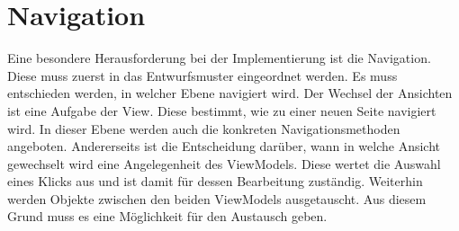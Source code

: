 \section{Navigation}
Eine besondere Herausforderung bei der Implementierung ist die Navigation. Diese muss zuerst in das Entwurfsmuster eingeordnet werden. Es muss entschieden werden, in welcher Ebene navigiert wird. Der Wechsel der Ansichten ist eine Aufgabe der View. Diese bestimmt, wie zu einer neuen Seite navigiert wird. In dieser Ebene werden auch die konkreten Navigationsmethoden angeboten. Andererseits ist die Entscheidung darüber, wann in welche Ansicht gewechselt wird eine Angelegenheit des ViewModels. Diese wertet die Auswahl eines Klicks aus und ist damit für dessen Bearbeitung zuständig. Weiterhin werden Objekte zwischen den beiden ViewModels ausgetauscht. Aus diesem Grund muss es eine Möglichkeit für den Austausch geben. \par 

